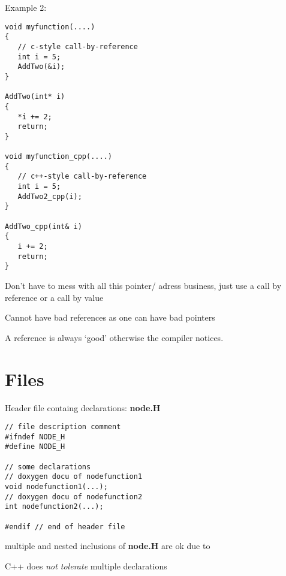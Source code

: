 Example 2:\\
\begin{minipage}{0.45\linewidth}
\begin{boxedminipage}{\linewidth}
\begin{verbatim}
void myfunction(....)
{
   // c-style call-by-reference
   int i = 5;
   AddTwo(&i);
}

AddTwo(int* i)
{
   *i += 2;
   return;
}

void myfunction_cpp(....)
{
   // c++-style call-by-reference
   int i = 5;
   AddTwo2_cpp(i);
}

AddTwo_cpp(int& i)
{
   i += 2;
   return;
}
\end{verbatim}
\end{boxedminipage}
\end{minipage}
\hfill
\begin{minipage}{0.45\linewidth}
\vspace*{3cm}
Don't have to mess with all this pointer/
adress business, just use a call by reference
or a call by value

Cannot have bad references as one can
have bad pointers

A reference is always `good' otherwise
the compiler notices.
\end{minipage}

\section{Files}
Header file containg declarations: \textbf{node.H}\\
\begin{minipage}{0.45\linewidth}
\begin{boxedminipage}{\linewidth}
\begin{verbatim}
// file description comment
#ifndef NODE_H
#define NODE_H

// some declarations
// doxygen docu of nodefunction1
void nodefunction1(...);
// doxygen docu of nodefunction2
int nodefunction2(...);

#endif // end of header file
\end{verbatim}
\end{boxedminipage}
\end{minipage}
\hfill
\begin{minipage}{0.45\linewidth}
multiple and nested inclusions
of \textbf{node.H} are ok due to 

C++ does \emph{not tolerate} multiple
declarations
\end{minipage}


